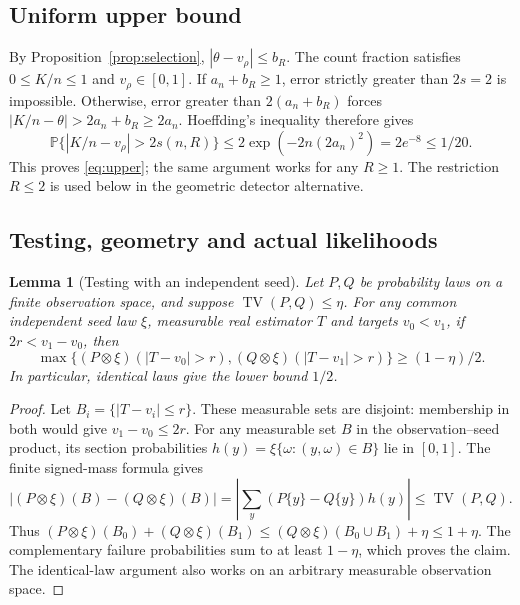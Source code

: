 \documentclass[11pt]{article}
\newtheorem{lemma}[theorem]{Lemma}
\theoremstyle{remark}
\newcommand{\Prb}{\mathbb P}
\newcommand{\TV}{\operatorname{TV}}
\begin{document}
\subsection{Uniform upper bound}
By Proposition~\ref{prop:selection}, $|\theta-v_\rho|\le b_R$.
The count fraction satisfies $0\le K/n\le1$ and $v_\rho\in[0,1]$.
If $a_n+b_R\ge1$, error strictly greater than $2s=2$ is impossible.
Otherwise, error greater than $2(a_n+b_R)$ forces
$|K/n-\theta|>2a_n+b_R\ge2a_n$. Hoeffding's inequality therefore gives
\[
 \Prb\{|K/n-v_\rho|>2s(n,R)\}
 \le2\exp(-2n(2a_n)^2)=2e^{-8}\le1/20.
\]
This proves \eqref{eq:upper}; the same argument works for any $R\ge1$.
The restriction $R\le2$ is used below in the geometric detector alternative.

\subsection{Testing, geometry and actual likelihoods}
\begin{lemma}[Testing with an independent seed]\label{lem:testing}
Let $P,Q$ be probability laws on a finite observation space, and suppose
$\TV(P,Q)\le\eta$. For any common independent seed law $\xi$, measurable
real estimator $T$ and targets $v_0<v_1$, if $2r<v_1-v_0$, then
\[
 \max\{(P\otimes\xi)(|T-v_0|>r),
          (Q\otimes\xi)(|T-v_1|>r)\}\ge(1-\eta)/2.
\]
In particular, identical laws give the lower bound $1/2$.
\end{lemma}
\begin{proof}
Let $B_i=\{|T-v_i|\le r\}$. These measurable sets are disjoint:
membership in both would give $v_1-v_0\le2r$. For any measurable set
$B$ in the observation--seed product, its section probabilities
$h(y)=\xi\{\omega:(y,\omega)\in B\}$ lie in $[0,1]$. The finite
signed-mass formula gives
\[
 |(P\otimes\xi)(B)-(Q\otimes\xi)(B)|
 =\left|\sum_y(P\{y\}-Q\{y\})h(y)\right|\le\TV(P,Q).
\]
Thus $(P\otimes\xi)(B_0)+(Q\otimes\xi)(B_1)
\le(Q\otimes\xi)(B_0\cup B_1)+\eta\le1+\eta$.
The complementary failure probabilities sum to at least $1-\eta$,
which proves the claim. The identical-law argument also works on an
arbitrary measurable observation space.
\end{proof}
\end{document}
